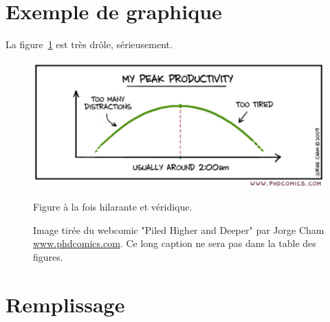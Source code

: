 \section{Exemple de graphique}

La figure~\ref{fig:phdcomics} est très drôle, sérieusement.

\begin{figure}[htb]
    \begin{center}
        \includegraphics[width=0.8\columnwidth]{Figures/phd083109s.pdf} 
        \caption{\label{fig:phdcomics} Figure à la fois hilarante et véridique.}
        \vspace{-10pt}
        \caption*{ Image tirée du webcomic "Piled Higher and Deeper" par Jorge Cham
                   \href{www.phdcomics.com}{www.phdcomics.com}. 
                   Ce long caption ne sera pas dans la table des figures.
                 }
    \end{center}
\end{figure}

\section{Remplissage}
\kant[11-14]
